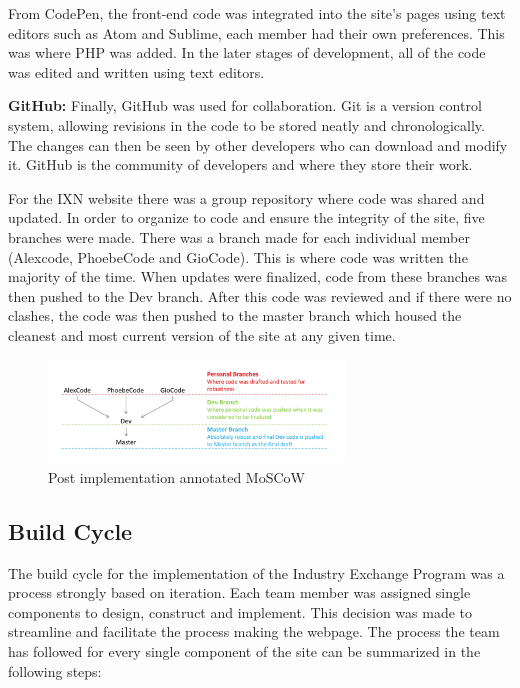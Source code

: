 \documentclass[fontsize=10pt]{extarticle}
\numberwithin{figure}{section} %
\begin{document}
From CodePen, the front-end code was integrated into the site's pages
using text editors such as Atom and Sublime, each member had their own
preferences. This was where PHP was added. In the later stages of
development, all of the code was edited and written using text editors.

\textbf{GitHub:} Finally, GitHub was used for collaboration. Git is a
version control system, allowing revisions in the code to be stored
neatly and chronologically. The changes can then be seen by other
developers who can download and modify it. \cite{p20} GitHub is the
community of developers and where they store their work.

For the IXN website there was a group repository where code was shared
and updated. In order to organize to code and ensure the integrity of
the site, five branches were made. There was a branch made for each
individual member (Alexcode, PhoebeCode and GioCode). This is where code
was written the majority of the time. When updates were finalized, code
from these branches was then pushed to the Dev branch. After this code
was reviewed and if there were no clashes, the code was then pushed to
the master branch which housed the cleanest and most current version of
the site at any given time.

\begin{figure}[H]
      \centering
      \includegraphics[trim = 0 0 0 0, clip, width=0.7\textwidth]{ph15.png}
      \caption{Post implementation annotated MoSCoW}
 \end{figure}

\hypertarget{build-cycle}{%
\subsection{Build Cycle}\label{build-cycle}}

The build cycle for the implementation of the Industry Exchange Program
was a process strongly based on iteration. Each team member was assigned
single components to design, construct and implement. This decision was
made to streamline and facilitate the process making the webpage. The
process the team has followed for every single component of the site can
be summarized in the following steps:
\end{document}
